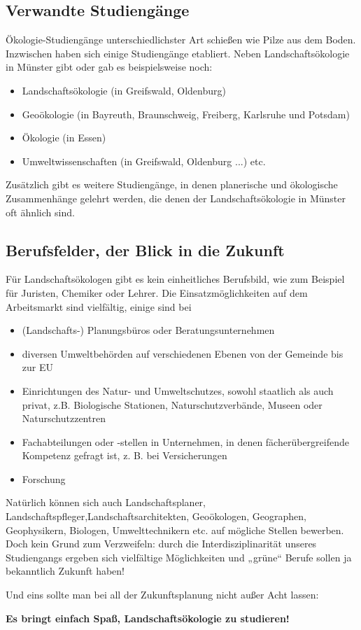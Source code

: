 \subsection*{Verwandte Studiengänge}
Ökologie-Studiengänge unterschiedlichster Art schießen wie Pilze aus dem Boden. Inzwischen haben sich einige Studiengänge etabliert. Neben Landschaftsökologie in Münster gibt oder gab es beispielsweise noch:
\begin{itemize}
  \item Landschaftsökologie (in Greifswald, Oldenburg)
  \item Geoökologie (in Bayreuth, Braunschweig, Freiberg, Karlsruhe und Potsdam)
  \item Ökologie (in Essen)
  \item Umweltwissenschaften (in Greifswald, Oldenburg ...) etc.
\end{itemize}
Zusätzlich gibt es weitere Studiengänge, in denen planerische und ökologische Zusammenhänge gelehrt werden, die denen der Landschaftsökologie in Münster oft ähnlich sind. 

\subsection*{Berufsfelder, der Blick in die Zukunft}
Für Landschaftsökologen gibt es kein einheitliches Berufsbild, wie zum Beispiel für Juristen, Chemiker oder Lehrer. Die Einsatzmöglichkeiten auf dem Arbeitsmarkt sind vielfältig, einige sind bei
\begin{itemize}
  \item (Landschafts-) Planungsbüros oder Beratungsunternehmen
  \item diversen Umweltbehörden auf verschiedenen Ebenen von der Gemeinde bis zur EU
  \item Einrichtungen des Natur- und Umweltschutzes, sowohl staatlich als auch privat, z.B. Biologische Stationen, Naturschutzverbände, Museen oder Naturschutzzentren
  \item Fachabteilungen oder -stellen in Unternehmen, in denen fächerübergreifende Kompetenz gefragt ist, z. B. bei Versicherungen
  \item{Forschung}
\end{itemize}
Natürlich können sich auch Landschaftsplaner, Landschaftspﬂeger,Landschaftsarchitekten, Geoökologen, Geographen, Geophysikern, Biologen, Umwelttechnikern etc. auf mögliche Stellen bewerben. Doch kein Grund zum Verzweifeln: durch die Interdisziplinarität unseres Studiengangs ergeben sich vielfältige Möglichkeiten und „grüne“ Berufe sollen ja bekanntlich Zukunft haben!

Und eins sollte man bei all der Zukunftsplanung nicht außer Acht lassen: 

\textbf{Es bringt einfach Spaß, Landschaftsökologie zu studieren!}

